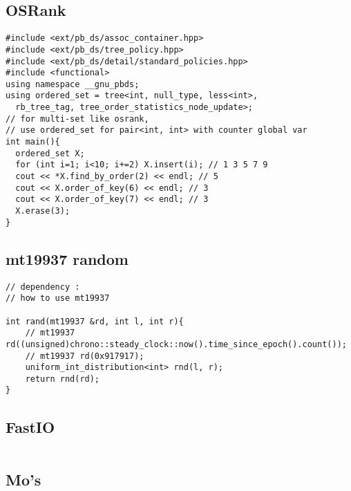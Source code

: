 \subsection{OSRank} %
\begin{verbatim}
#include <ext/pb_ds/assoc_container.hpp>
#include <ext/pb_ds/tree_policy.hpp>
#include <ext/pb_ds/detail/standard_policies.hpp>
#include <functional>
using namespace __gnu_pbds;
using ordered_set = tree<int, null_type, less<int>,
  rb_tree_tag, tree_order_statistics_node_update>;
// for multi-set like osrank,
// use ordered_set for pair<int, int> with counter global var
int main(){
  ordered_set X;
  for (int i=1; i<10; i+=2) X.insert(i); // 1 3 5 7 9
  cout << *X.find_by_order(2) << endl; // 5
  cout << X.order_of_key(6) << endl; // 3
  cout << X.order_of_key(7) << endl; // 3
  X.erase(3);
}
\end{verbatim}

\subsection{mt19937 random} %
\begin{verbatim}
// dependency :
// how to use mt19937

int rand(mt19937 &rd, int l, int r){
    // mt19937 rd((unsigned)chrono::steady_clock::now().time_since_epoch().count());
    // mt19937 rd(0x917917);
    uniform_int_distribution<int> rnd(l, r);
    return rnd(rd);
}
\end{verbatim}

\subsection{FastIO} %
\inputminted{cpp}{src/Misc/fastio.cpp}

\subsection{Mo's} %
\inputminted{cpp}{src/Misc/mo.cpp}

